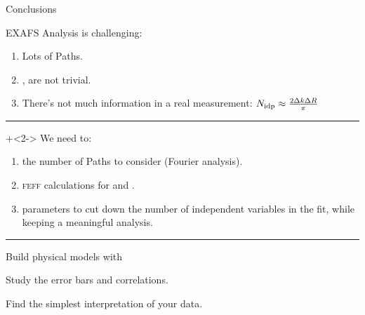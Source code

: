 
\begin{slide}{Conclusions}

\begin{cenpage}{100mm}
  EXAFS Analysis is challenging:

  \begin{enumerate}
  \item Lots of Paths.

  \item {},  are not trivial.

  \item There's not much information in a real measurement:
    $ N_{\rm idp} \approx \frac{2\Delta k\Delta R}{\pi} $

  \end{enumerate}

  \vmm \hrule \vmm
  \onslide+<2->
  We need to:

   \begin{enumerate}
   \item {} the number of Paths to consider (Fourier analysis).
   \item {}  {\scshape{feff}} calculations for   and .
   \item {} parameters to cut down the number of independent
     variables in the fit, while keeping a meaningful analysis.
   \end{enumerate}

  \vmm \hrule \vmm


  Build physical models with {}

  \vmm
  Study the error bars and correlations.

  \vmm
  Find the simplest interpretation of your data.
  \vmm

 \vfill
\end{cenpage}
\end{slide}



